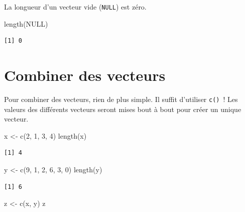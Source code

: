 \documentclass[
  letterpaper,
  DIV=11,
  numbers=noendperiod,
  oneside]{scrreprt}
\newenvironment{Shaded}{\begin{snugshade}}{\end{snugshade}}
\newcommand{\ConstantTok}[1]{\textcolor[rgb]{0.56,0.35,0.01}{#1}}
\newcommand{\DecValTok}[1]{\textcolor[rgb]{0.68,0.00,0.00}{#1}}
\newcommand{\FunctionTok}[1]{\textcolor[rgb]{0.28,0.35,0.67}{#1}}
\newcommand{\NormalTok}[1]{\textcolor[rgb]{0.00,0.23,0.31}{#1}}
\newcommand{\OtherTok}[1]{\textcolor[rgb]{0.00,0.23,0.31}{#1}}
\begin{document}
La longueur d'un vecteur vide (\texttt{NULL}) est zéro.

\begin{Shaded}
\begin{Highlighting}[]
\FunctionTok{length}\NormalTok{(}\ConstantTok{NULL}\NormalTok{)}
\end{Highlighting}
\end{Shaded}

\begin{verbatim}
[1] 0
\end{verbatim}

\hypertarget{combiner-des-vecteurs}{%
\section{Combiner des vecteurs}\label{combiner-des-vecteurs}}

Pour combiner des vecteurs, rien de plus simple. Il suffit d'utiliser
\texttt{c()}~! Les valeurs des différents vecteurs seront mises bout à
bout pour créer un unique vecteur.

\begin{Shaded}
\begin{Highlighting}[]
\NormalTok{x }\OtherTok{\textless{}{-}} \FunctionTok{c}\NormalTok{(}\DecValTok{2}\NormalTok{, }\DecValTok{1}\NormalTok{, }\DecValTok{3}\NormalTok{, }\DecValTok{4}\NormalTok{)}
\FunctionTok{length}\NormalTok{(x)}
\end{Highlighting}
\end{Shaded}

\begin{verbatim}
[1] 4
\end{verbatim}

\begin{Shaded}
\begin{Highlighting}[]
\NormalTok{y }\OtherTok{\textless{}{-}} \FunctionTok{c}\NormalTok{(}\DecValTok{9}\NormalTok{, }\DecValTok{1}\NormalTok{, }\DecValTok{2}\NormalTok{, }\DecValTok{6}\NormalTok{, }\DecValTok{3}\NormalTok{, }\DecValTok{0}\NormalTok{)}
\FunctionTok{length}\NormalTok{(y)}
\end{Highlighting}
\end{Shaded}

\begin{verbatim}
[1] 6
\end{verbatim}

\begin{Shaded}
\begin{Highlighting}[]
\NormalTok{z }\OtherTok{\textless{}{-}} \FunctionTok{c}\NormalTok{(x, y)}
\NormalTok{z}
\end{Highlighting}
\end{Shaded}
\end{document}
